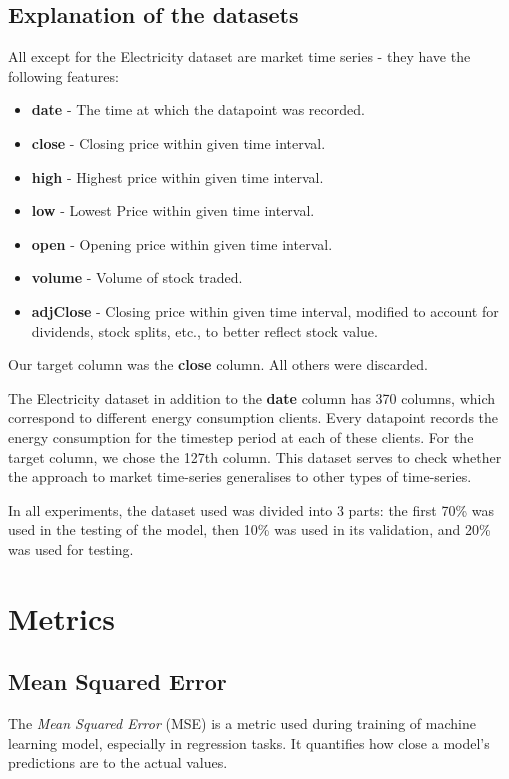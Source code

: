 \subsection{Explanation of the datasets}
All except for the Electricity dataset are market time series - they have the following features:
\begin{itemize}
	\item \textbf{date} - The time at which the datapoint was recorded.
	\item \textbf{close} - Closing price within given time interval.
	\item \textbf{high} - Highest price within given time interval.
	\item \textbf{low} - Lowest Price within given time interval.
	\item \textbf{open} - Opening price within given time interval.
	\item \textbf{volume} - Volume of stock traded.
	\item \textbf{adjClose} - Closing price within given time interval, modified to account for dividends, stock splits, etc., to better reflect stock value.
\end{itemize}
Our target column was the \textbf{close} column. All others were discarded.


The Electricity dataset in addition to the \textbf{date} column has 370 columns, which correspond to different energy consumption clients. Every datapoint records the energy consumption for the timestep period at each of these clients. For the target column, we chose the 127th column.
This dataset serves to check whether the approach to market time-series generalises to other types of time-series.

In all experiments, the dataset used was divided into 3 parts: the first 70\% was used in the testing of the model, then 10\% was used in its validation, and 20\% was used for testing.


\section{Metrics}

\subsection{Mean Squared Error}
The \emph{Mean Squared Error} (MSE) is a metric used during training of machine learning model, especially in regression tasks. It quantifies how close a model's predictions are to the actual values.

